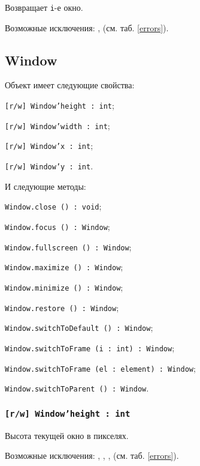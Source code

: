 Возвращает \texttt{i}-е окно.

Возможные исключения: ,  (см. таб. \ref{errors}).

\subsection{{\color{orange} Window}}

Объект \window{} имеет следующие свойства:
\begin{icItems}
	\item \texttt{[r/w] Window'height : int};
	\item \texttt{[r/w] Window'width : int};
	\item \texttt{[r/w] Window'x : int};
	\item \texttt{[r/w] Window'y : int}.
\end{icItems}

И следующие методы:
\begin{icItems}
	\item \texttt{Window.close () : void};
	\item \texttt{Window.focus () : Window};
	\item \texttt{Window.fullscreen () : Window};
	\item \texttt{Window.maximize () : Window};
	\item \texttt{Window.minimize () : Window};
	\item \texttt{Window.restore () : Window};
	\item \texttt{Window.switchToDefault () : Window};
	\item \texttt{Window.switchToFrame (i : int) : Window};
	\item \texttt{Window.switchToFrame (el : element) : Window};
	\item \texttt{Window.switchToParent () : Window}.
\end{icItems}

\subsubsection{\texttt{[r/w] Window'height : int}}

Высота текущей окно в пикселях.

Возможные исключения: , , ,  (см. таб. \ref{errors}).

